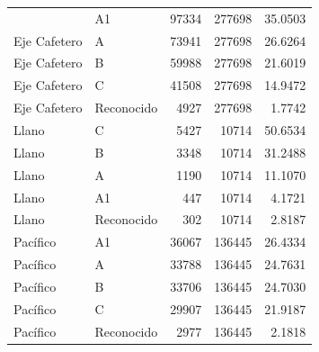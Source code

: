 \begin{longtable}{llrrr}
{{Eje Cafetero & A1 & 97334 & 277698 & 35.0503 \\
Eje Cafetero & A & 73941 & 277698 & 26.6264 \\
Eje Cafetero & B & 59988 & 277698 & 21.6019 \\
Eje Cafetero & C & 41508 & 277698 & 14.9472 \\
Eje Cafetero & Reconocido & 4927 & 277698 & 1.7742 \\
Llano & C & 5427 & 10714 & 50.6534 \\
Llano & B & 3348 & 10714 & 31.2488 \\
Llano & A & 1190 & 10714 & 11.1070 \\
Llano & A1 & 447 & 10714 & 4.1721 \\
Llano & Reconocido & 302 & 10714 & 2.8187 \\
Pacífico & A1 & 36067 & 136445 & 26.4334 \\
Pacífico & A & 33788 & 136445 & 24.7631 \\
Pacífico & B & 33706 & 136445 & 24.7030 \\
Pacífico & C & 29907 & 136445 & 21.9187 \\
Pacífico & Reconocido & 2977 & 136445 & 2.1818 \\
\end{longtable}
